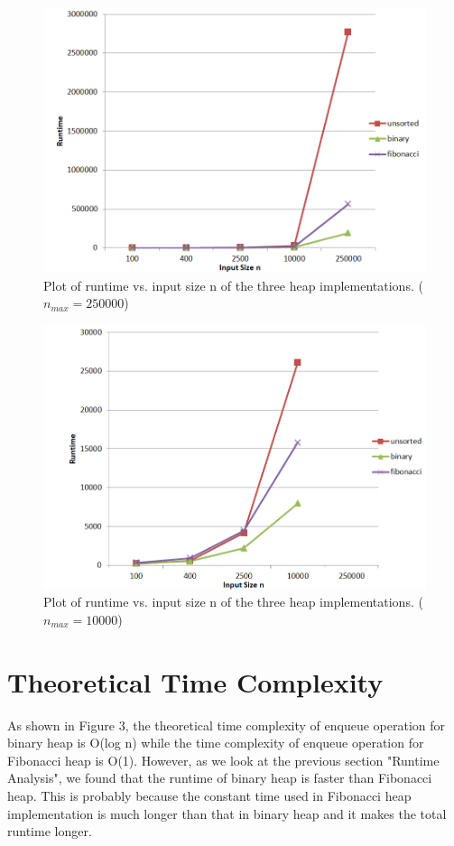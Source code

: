 \documentclass[a4paper]{article}
\begin{document}
\begin{figure}[htbp]
\centering
\includegraphics[scale=0.5]{p1new.png}
\caption{Plot of runtime vs. input size n of the three heap implementations. ($n_{max}=250000$)}
\end{figure}
\begin{figure}[htbp]
\centering
\includegraphics[scale=0.5]{p2new.png}
\caption{Plot of runtime vs. input size n of the three heap implementations. ($n_{max}=10000$)}
\end{figure}

\section{Theoretical Time Complexity}
\noindent
\par
As shown in Figure 3, the theoretical time complexity of enqueue operation for binary heap is O(log n) while the time complexity of enqueue operation for Fibonacci heap is O(1). However, as we look at the previous section "Runtime Analysis", we found that the runtime of binary heap is faster than Fibonacci heap. This is probably because the constant time used in Fibonacci heap implementation is much longer than that in binary heap and it makes the total runtime longer.
\end{document}
